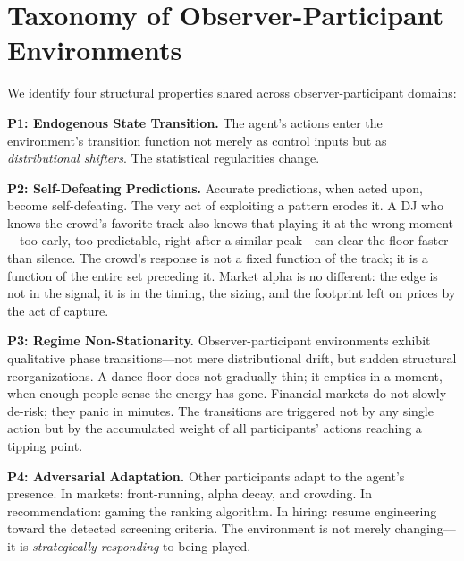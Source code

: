 \documentclass[11pt,a4paper]{article}
\begin{document}
\section{Taxonomy of Observer-Participant Environments}

We identify four structural properties shared across observer-participant domains:

\textbf{P1: Endogenous State Transition.} The agent's actions enter the environment's transition function not merely as control inputs but as \textit{distributional shifters}. The statistical regularities change.

\textbf{P2: Self-Defeating Predictions.} Accurate predictions, when acted upon, become self-defeating. The very act of exploiting a pattern erodes it. A DJ who knows the crowd's favorite track also knows that playing it at the wrong moment---too early, too predictable, right after a similar peak---can clear the floor faster than silence. The crowd's response is not a fixed function of the track; it is a function of the entire set preceding it. Market alpha is no different: the edge is not in the signal, it is in the timing, the sizing, and the footprint left on prices by the act of capture.

\textbf{P3: Regime Non-Stationarity.} Observer-participant environments exhibit qualitative phase transitions---not mere distributional drift, but sudden structural reorganizations. A dance floor does not gradually thin; it empties in a moment, when enough people sense the energy has gone. Financial markets do not slowly de-risk; they panic in minutes. The transitions are triggered not by any single action but by the accumulated weight of all participants' actions reaching a tipping point.

\textbf{P4: Adversarial Adaptation.} Other participants adapt to the agent's presence. In markets: front-running, alpha decay, and crowding. In recommendation: gaming the ranking algorithm. In hiring: resume engineering toward the detected screening criteria. The environment is not merely changing---it is \textit{strategically responding} to being played.
\end{document}
